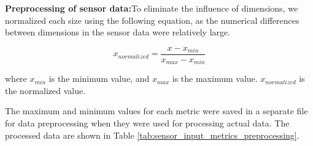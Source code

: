\documentclass[acmsmall,manuscript, screen, review]{acmart}
\begin{document}
\textbf{Preprocessing of sensor data:}To eliminate the influence of dimensions, we normalized each size using the following equation, as the numerical differences between dimensions in the sensor data were relatively large.



\begin{equation}
  x_{normalized} = \frac{x - x_{min}}{x_{max} - x_{min}}
\end{equation}

where \begin{math}
  x_{min}
\end{math} is the minimum value, and \begin{math}
  x_{max}
\end{math} is the maximum value. \begin{math}
  x_{normalized}
\end{math} is the normalized value.

The maximum and minimum values for each metric were saved in a separate file for data preprocessing when they were used for processing actual data. The processed data are shown in Table \ref{tab:sensor_input_metrics_preprocessing}.
\end{document}
